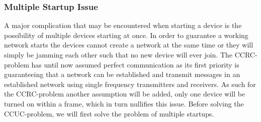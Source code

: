 \subsubsection*{Multiple Startup Issue}\label{msiCCRC}
A major complication that may be encountered when starting a device is the possibility of multiple devices starting at once.
In order to guarantee a working network starts the devices cannot create a network at the same time or they will simply be jamming each other such that no new device will ever join.
The CCRC-problem has until now assumed perfect communication as its first priority is guaranteeing that a network can be established and transmit messages in an established network using single frequency transmitters and receivers.
As such for the CCRC-problem another assumption will be added, only one device will be turned on within a frame, which in turn nullifies this issue.
Before solving the CCUC-problem, we will first solve the problem of multiple startups.